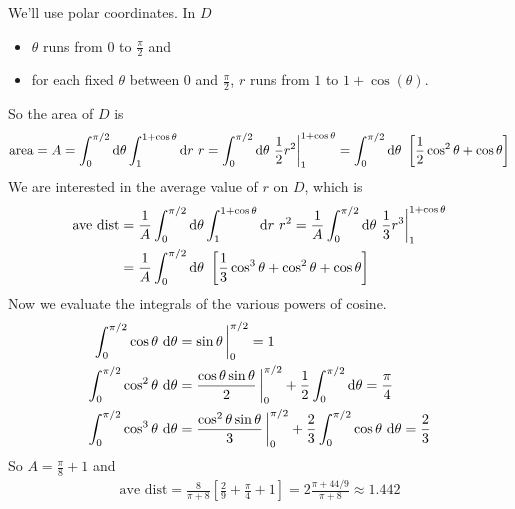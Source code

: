 \begin{solution} 
We'll use polar coordinates. In $D$
\begin{itemize}
\item
$\theta$ runs from $0$ to $\frac{\pi}{2}$ and
\item
for each fixed $\theta$ between $0$ and $\frac{\pi}{2}$, $r$ runs from
$1$ to $1+\cos(\theta)$.
\end{itemize}
So the area of $D$ is 
\begin{equation*}
\text{area}=A=\int_0^{\pi/2} \mathrm{d}\theta\int_1^{1+\cos\theta} \mathrm{d}r\ r
=\int_0^{\pi/2} \mathrm{d}\theta\ \frac{1}{2} r^2\bigg|_1^{1+\cos\theta} 
=\int_0^{\pi/2} \mathrm{d}\theta\ \left[\frac{1}{2} \cos^2\theta+\cos\theta\right]
\end{equation*}
We are interested in the average value of $r$ on $D$, which is
\begin{align*}
\text{ave\ dist}&=\frac{1}{A}\int_0^{\pi/2} \mathrm{d}\theta\int_1^{1+\cos\theta} 
                                    \mathrm{d}r\ r^2
=\frac{1}{A}\int_0^{\pi/2} \mathrm{d}\theta\ \frac{1}{3} r^3\bigg|_1^{1+\cos\theta}
\\ 
&=\frac{1}{A}\int_0^{\pi/2} \mathrm{d}\theta\ \left[\frac{1}{3} \cos^3\theta
                +\cos^2\theta+\cos\theta\right] 
\end{align*}
Now we evaluate the integrals of the various powers of cosine.
\begin{align*}
\int_0^{\pi/2}\cos\theta\ \dee{\theta}&=\sin\theta\,\bigg|_0^{\pi/2}=1 \\
\int_0^{\pi/2}\cos^2\theta\ \dee{\theta}&=\frac{\cos\theta\sin\theta}{2}\,\bigg|_0^{\pi/2}
+\frac{1}{2}\int _0^{\pi/2}\dee{\theta}=\frac{\pi}{4}\cr
\int_0^{\pi/2}\cos^3\theta\ \dee{\theta}&=\frac{\cos^2\theta\sin\theta}{3}\,\bigg|_0^{\pi/2}
+\frac{2}{3}\int _0^{\pi/2}\cos\theta\ \dee{\theta}=\frac{2}{3}\cr
\end{align*}
So $A=\frac{\pi}{8}+1$ and
\begin{align*}
\text{ave\ dist}=\frac{8}{\pi+8}\left[\frac{2}{9}+\frac{\pi}{4}+1\right]
=2\frac{\pi+44/9}{\pi+8}\approx 1.442
\end{align*}
\end{solution}



